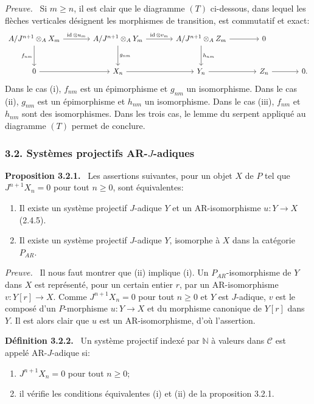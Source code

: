 \documentclass[11pt]{article}
\providecommand{\NN}{\mathbb{N}}
\newenvironment{statement}[1]{\par\medskip\noindent\textbf{#1.}\ }{\par\medskip}
\newenvironment{prooftext}[1][Proof]{\par\noindent\emph{#1.}\ }{\par\medskip}
\providecommand{\id}{\operatorname{id}}
\providecommand{\NN}{\mathbb N}
\providecommand{\cC}{\mathcal C}
\providecommand{\id}{\operatorname{id}}
\providecommand{\id}{\operatorname{id}}
\providecommand{\id}{\operatorname{id}}
\providecommand{\id}{\operatorname{id}}
\providecommand{\cC}{\mathcal C}
\begin{document}
\begin{prooftext}[Preuve]
Si $m\ge n$, il est clair que le diagramme $(T)$ ci-dessous, dans lequel les flèches verticales désignent les morphismes de transition, est commutatif et exact:
\[
\begin{tikzcd}[column sep=large,row sep=large]
A/J^{n+1}\otimes_A X_m \arrow[r,"\id\otimes u_m"] \arrow[d,"f_{nm}"'] & A/J^{n+1}\otimes_A Y_m \arrow[r,"\id\otimes v_m"] \arrow[d,"g_{nm}"] & A/J^{n+1}\otimes_A Z_m \arrow[r] \arrow[d,"h_{nm}"] & 0\\
0 \arrow[r] & X_n \arrow[r] & Y_n \arrow[r] & Z_n \arrow[r] & 0 .
\end{tikzcd}
\]
Dans le cas (i), $f_{nm}$ est un épimorphisme et $g_{nm}$ un isomorphisme. Dans le cas (ii), $g_{nm}$ est un épimorphisme et $h_{nm}$ un isomorphisme. Dans le cas (iii), $f_{nm}$ et $h_{nm}$ sont des isomorphismes. Dans les trois cas, le lemme du serpent appliqué au diagramme $(T)$ permet de conclure.
\end{prooftext}

\subsubsection*{3.2. Systèmes projectifs AR-$J$-adiques}
\begin{statement}{Proposition 3.2.1}
Les assertions suivantes, pour un objet $X$ de $P$ tel que $J^{n+1}X_n=0$ pour tout $n\ge0$, sont équivalentes:
\begin{enumerate}[label=(\roman*)]
\item Il existe un système projectif $J$-adique $Y$ et un AR-isomorphisme $u:Y\to X$ (2.4.5).
\item Il existe un système projectif $J$-adique $Y$, isomorphe à $X$ dans la catégorie $P_{AR}$.
\end{enumerate}
\end{statement}

\begin{prooftext}[Preuve]
Il nous faut montrer que (ii) implique (i). Un $P_{AR}$-isomorphisme de $Y$ dans $X$ est représenté, pour un certain entier $r$, par un AR-isomorphisme $v:Y[r]\to X$. Comme $J^{n+1}X_n=0$ pour tout $n\ge0$ et $Y$ est $J$-adique, $v$ est le composé d'un $P$-morphisme $u:Y\to X$ et du morphisme canonique de $Y[r]$ dans $Y$. Il est alors clair que $u$ est un AR-isomorphisme, d'où l'assertion.
\end{prooftext}

\begin{statement}{Définition 3.2.2}
Un système projectif indexé par $\NN$ à valeurs dans $\cC$ est appelé AR-$J$-adique si:
\begin{enumerate}[label=(\alph*)]
\item $J^{n+1}X_n=0$ pour tout $n\ge0$;
\item il vérifie les conditions équivalentes (i) et (ii) de la proposition 3.2.1.
\end{enumerate}
\end{statement}
\end{document}
